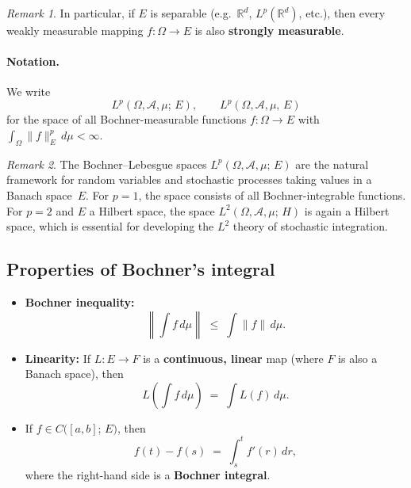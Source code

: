 \documentclass[11pt]{article}
\theoremstyle{definition}
\theoremstyle{remark}
\newtheorem{remark}{Remark}
\begin{document}
\begin{remark}
In particular, if $E$ is separable
(e.g.\ $\mathbb{R}^d$, $L^p(\mathbb{R}^d)$, etc.),
then every weakly measurable mapping $f \colon \Omega \to E$ is
also \textbf{strongly measurable}.
\end{remark}

\paragraph{Notation.}
We write
\[
    L^p(\Omega, \mathcal{A}, \mu;\, E),
    \qquad
    L^p(\Omega, \mathcal{A}, \mu,\, E)
\]
for the space of all Bochner-measurable functions
$f \colon \Omega \to E$ with
$\int_\Omega \|f\|_E^p\,d\mu < \infty$.

\begin{remark}
The Bochner--Lebesgue spaces $L^p(\Omega, \mathcal{A}, \mu;\, E)$ are the natural framework for random variables and stochastic processes taking values in a Banach space~$E$.  For $p = 1$, the space consists of all Bochner-integrable functions.  For $p = 2$ and $E$ a Hilbert space, the space $L^2(\Omega, \mathcal{A}, \mu;\, H)$ is again a Hilbert space, which is essential for developing the $L^2$ theory of stochastic integration.
\end{remark}

\subsection*{Properties of Bochner's integral}

\begin{itemize}
    \item[(i)] \textbf{Bochner inequality:}
    \[
        \left\|\int f\,d\mu\right\|
        \;\le\;
        \int \|f\|\,d\mu.
    \]

    \item[(ii)] \textbf{Linearity:} If $L \colon E \to F$ is a
    \textbf{continuous, linear} map (where $F$ is also a Banach space), then
    \[
        L\!\left(\int f\,d\mu\right)
        \;=\;
        \int L(f)\,d\mu.
    \]

    \item[(iii)] If $f \in C\bigl([a,b];\, E\bigr)$,
    then
    \[
        f(t) - f(s) \;=\; \int_s^t f'(r)\,dr,
    \]
    where the right-hand side is a \textbf{Bochner integral}.

\end{itemize}
\end{document}
